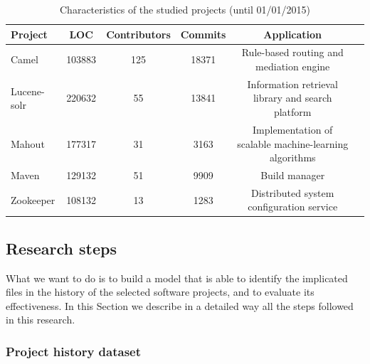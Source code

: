 \begin{table}[ht]
\centering
\caption{Characteristics of the studied projects %
(until 01/01/2015)}
\label{tab:projects}
\footnotesize
\begin{tabular}{|l|c|c|c|c|c|}
\hline
\textbf{Project} & \textbf{LOC} & \textbf{Contributors} & \textbf{Commits} & \textbf{Application} \\%
\hline
Camel   & 103883  & 125 & 18371  & Rule-based routing and mediation engine \\
\hline
Lucene-solr & 220632 & 55 & 13841  & Information retrieval library and search platform\\
\hline
Mahout      & 177317 & 31 & 3163 &   Implementation of scalable machine-learning algorithms \\
\hline
Maven       & 129132 & 51 & 9909 &   Build manager \\
\hline
Zookeeper   & 108132 & 13  & 1283 &  Distributed system configuration service \\
\hline
\end{tabular}
\end{table}

\subsection{Research steps}

What we want to do is to build a model that is able to identify the implicated files in the history of the selected software projects, and to evaluate its effectiveness. In this Section we describe in a detailed way all the steps followed in this research.

\subsubsection{Project history dataset}
\label{sec:history-dataset}

